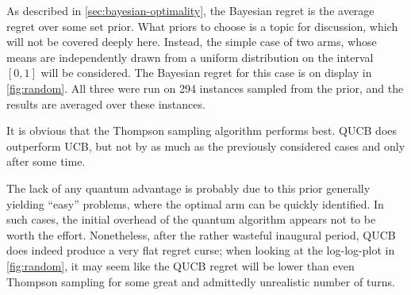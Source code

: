 As described in \cref{sec:bayesian-optimality}, the Bayesian regret is the average regret over some set prior.
What priors to choose is a topic for discussion, which will not be covered deeply here.
Instead, the simple case of two arms, whose means are independently drawn from a uniform distribution on the interval $[0, 1]$ will be considered.
The Bayesian regret for this case is on display in \cref{fig:random}.
All three were run on 294 instances sampled from the prior\footnotemark, and the results are averaged over these instances.


It is obvious that the Thompson sampling algorithm performs best.
QUCB does outperform UCB, but not by as much as the previously considered cases and only after some time.

The lack of any quantum advantage is probably due to this prior generally yielding \enquote{easy} problems, where the optimal arm can be quickly identified.
In such cases, the initial overhead of the quantum algorithm appears not to be worth the effort.
Nonetheless, after the rather wasteful inaugural period, QUCB does indeed produce a very flat regret curse; when looking at the log-log-plot in \cref{fig:random}, it may seem like the QUCB regret will be lower than even Thompson sampling for some great and admittedly unrealistic number of turns.



